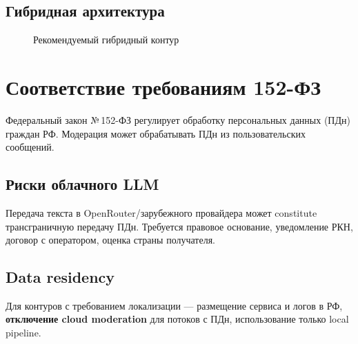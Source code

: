 \documentclass[12pt,a4paper]{report}
\begin{document}
\section{Гибридная архитектура}

\begin{figure}[H]
\centering
{}
\caption{Рекомендуемый гибридный контур}
\end{figure}

\chapter{Соответствие требованиям 152-ФЗ}

Федеральный закон №\,152-ФЗ регулирует обработку персональных данных (ПДн)
граждан РФ. Модерация может обрабатывать ПДн из пользовательских сообщений.

\section{Риски облачного LLM}

Передача текста в OpenRouter/зарубежного провайдера может constitute
трансграничную передачу ПДн. Требуется правовое основание, уведомление РКН,
договор с оператором, оценка страны получателя.

\section{Data residency}

Для контуров с требованием локализации --- размещение сервиса и логов в РФ,
\textbf{отключение cloud moderation} для потоков с ПДн, использование только local pipeline.
\end{document}
